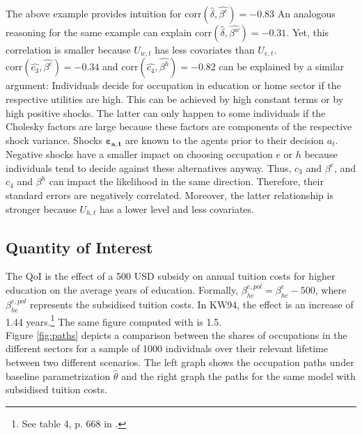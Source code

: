 \documentclass[a4paper,12pt]{article}
\begin{document}
The above example provides intuition for $\text{corr}(\hat{\delta},\hat{\beta^e})=-0.83$ An analogous reasoning for the same example can explain $\text{corr}(\hat{\delta},\hat{\beta^w})=-0.31$. Yet, this correlation is smaller because $U_{w,t}$ has less covariates than $U_{e,t}$. $\text{corr}(\hat{c_3},\hat{\beta^e})=-0.34$ and $\text{corr}(\hat{c_4},\hat{\beta^h})=-0.82$ can be explained by a similar argument: Individuals decide for occupation in education or home sector if the respective utilities are high. This can be achieved by high constant terms or by high positive shocks. The latter can only happen to some individuals if the Cholesky factors are large because these factors are components of the respective shock variance. Shocks $\pmb{\varepsilon_{a,t}}$ are known to the agents prior to their decision $a_t$. Negative shocks have a smaller impact on choosing occupation $e$ or $h$ because individuals tend to decide against these alternatives anyway. Thus, $c_3$ and $\beta^e$, and $c_4$ and $\beta^h$ can impact the likelihood in the same direction. Therefore, their standard errors are negatively correlated. Moreover, the latter relationship is stronger because $U_{h,t}$ has a lower level and less covariates.


\subsection{Quantity of Interest}

The QoI is the effect of a 500 USD subsidy on annual tuition costs for higher education on the average years of education. Formally, $\beta_{he}^{e,pol} = \beta_{he}^e - 500$, where $\beta_{he}^{e,pol}$ represents the subsidised tuition costs. In KW94, the effect is an increase of 1.44 years.\footnote{See table 4, p. 668 in \cite{Keane.1994}.} The same figure computed with  is 1.5.\\
\newline
Figure \ref{fig:paths} depicts a comparison between the shares of occupations in the different sectors for a sample of 1000 individuals over their relevant lifetime between two different scenarios. The left graph shows the occupation paths under baseline parametrization $\hat{\theta}$ and the right graph the paths for the same model with subsidised tuition costs.
\end{document}
